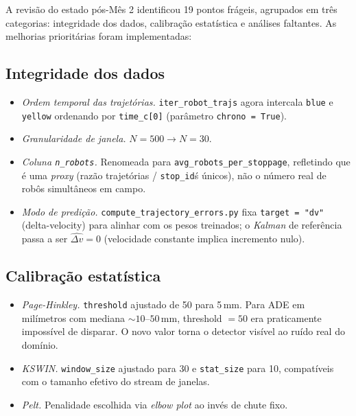 \documentclass[11pt,a4paper]{article}
\begin{document}
A revis\~ao do estado p\'os-M\^es 2 identificou 19 pontos fr\'ageis,
agrupados em tr\^es categorias: integridade dos dados, calibra\c{c}\~ao
estat\'istica e an\'alises faltantes. As melhorias priorit\'arias foram
implementadas:

\subsection{Integridade dos dados}

\begin{itemize}[leftmargin=1.4em,itemsep=2pt]
    \item \emph{Ordem temporal das trajet\'orias.} \texttt{iter\_robot\_trajs}
          agora intercala \texttt{blue} e \texttt{yellow} ordenando por
          \texttt{time\_c[0]} (par\^ametro \texttt{chrono = True}).
    \item \emph{Granularidade de janela.} $N=500 \to N=30$.
    \item \emph{Coluna \texttt{n\_robots}.} Renomeada para
          \texttt{avg\_robots\_per\_stoppage}, refletindo que \'e uma
          \emph{proxy} (raz\~ao trajet\'orias / \texttt{stop\_id}\'s
          \'unicos), n\~ao o n\'umero real de rob\^os simult\^aneos em
          campo.
    \item \emph{Modo de predi\c{c}\~ao.} \texttt{compute\_trajectory\_errors.py}
          fixa \texttt{target = "dv"} (delta-velocity) para alinhar com
          os pesos treinados; o \emph{Kalman} de refer\^encia passa a ser
          $\hat{\Delta v} = 0$ (velocidade constante implica incremento
          nulo).
\end{itemize}

\subsection{Calibra\c{c}\~ao estat\'istica}

\begin{itemize}[leftmargin=1.4em,itemsep=2pt]
    \item \emph{Page-Hinkley.} \texttt{threshold} ajustado de 50 para
          5\,mm. Para ADE em mil\'imetros com mediana
          \mbox{$\sim 10$--$50$}\,mm, threshold $= 50$ era praticamente
          imposs\'ivel de disparar. O novo valor torna o detector vis\'ivel
          ao ru\'ido real do dom\'inio.
    \item \emph{KSWIN.} \texttt{window\_size} ajustado para 30 e
          \texttt{stat\_size} para 10, compat\'iveis com o tamanho efetivo
          do stream de janelas.
    \item \emph{Pelt.} Penalidade escolhida via \emph{elbow plot} ao
          inv\'es de chute fixo.
\end{itemize}
\end{document}
